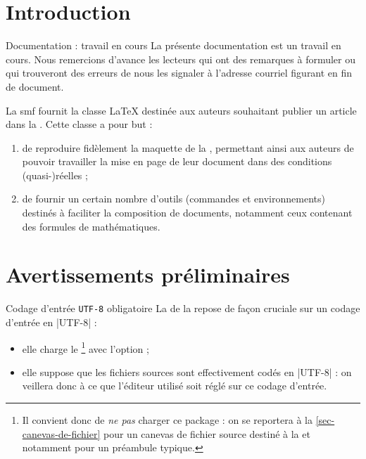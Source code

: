 \section{Introduction}
\label{sec-introduction}

\begin{dbremark}{Documentation : travail en cours}{}
  La présente documentation est un travail en cours. Nous remercions d'avance
  les lecteurs qui ont des remarques à formuler ou qui trouveront des erreurs de
  nous les signaler à l'adresse courriel figurant en fin de document.
\end{dbremark}

La \gls{smf} fournit la classe \LaTeX{} \gztauthor{} destinée aux auteurs
souhaitant publier un article dans la
\href{http://smf4.emath.fr/Publications/Gazette/}{\gzt*{}}. Cette classe a pour
but :
\begin{enumerate}
\item de reproduire fidèlement la maquette de la \gzt{}, permettant ainsi aux
  auteurs de pouvoir travailler la mise en page de leur document dans des
  conditions (quasi-)réelles ;
\item de fournir un certain nombre d'outils (commandes et environnements)
  destinés à faciliter la composition de documents, notamment ceux contenant des
  formules de mathématiques.
\end{enumerate}

\section{Avertissements préliminaires}
\label{sec:avert-prel}

\begin{dbwarning}{Codage d'entrée \protect\lstinline+UTF-8+ obligatoire}{}
  La \gztauthorcl{} de la \gzt{} repose de façon cruciale sur un codage
  d'entrée en |UTF-8| :
  \begin{itemize}
  \item elle charge le \footnote{%
      Il convient donc de \emph{ne pas} charger ce package : on se reportera
      à la \vref{sec-canevas-de-fichier} pour un canevas de fichier source
      destiné à la \gzt{} et notamment pour un préambule typique.%
    } avec l'option  ;
  \item elle suppose que les fichiers sources  sont effectivement
    codés en |UTF-8| : on veillera donc à ce que l'éditeur utilisé soit réglé
    sur ce codage d'entrée.
  \end{itemize}
\end{dbwarning}

